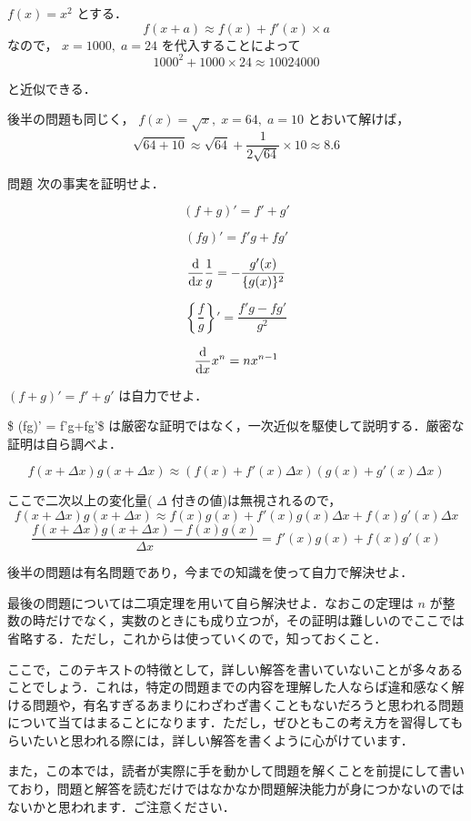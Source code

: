 \documentclass[
  b4paperpaper,
  xelatex,ja=standard]{bxjsbook}
\begin{document}

\(f(x)=x^2\) とする． \[f(x+a) \approx f(x) + f'(x) \times a\] なので，
\(x=1000,\; a=24\) を代入することによって
\[1000^2 + 1000 \times 24 \approx 10024000\]

と近似できる．

後半の問題も同じく， \(f(x)=\sqrt{x},\; x=64,\; a=10\) とおいて解けば，
\[\sqrt{64+10} \approx \sqrt{64} + \frac{1}{2\sqrt{64}} \times 10 \approx 8.6 \]

\begin{Qbox}{問題}
次の事実を証明せよ．

\[(f+g)'=f'+g'\]

\[ (fg)' = f'g+fg'\]

\[\dv{x}\frac{1}{g}=-\frac{g'(x)}{\{g(x)\}^2}\]

\[\left\{ \frac{f}{g} \right\} ' = \frac{f'g-fg'}{g^2}\]

\[\dv{x} x^n = nx^{n-1}\]

\end{Qbox}


\((f+g)'=f'+g'\) は自力でせよ．

\$ (fg)' = f'g+fg'\$
は厳密な証明ではなく，一次近似を駆使して説明する．厳密な証明は自ら調べよ．

\[f(x+\Delta x)g(x+\Delta x) \approx (f(x)+f'(x)\Delta x)(g(x)+g'(x)\Delta x)\]

ここで二次以上の変化量( \(\Delta\) 付きの値)は無視されるので，
\[f(x+\Delta x)g(x+\Delta x) \approx f(x)g(x) + f'(x)g(x)\Delta x + f(x)g'(x)\Delta x\]
\[\frac{f(x+\Delta x)g(x+\Delta x)-f(x)g(x)}{\Delta x} = f'(x)g(x)+f(x)g'(x)\]

後半の問題は有名問題であり，今までの知識を使って自力で解決せよ．

最後の問題については二項定理を用いて自ら解決せよ．なおこの定理は \(n\)
が整数の時だけでなく，実数のときにも成り立つが，その証明は難しいのでここでは省略する．ただし，これからは使っていくので，知っておくこと．

ここで，このテキストの特徴として，詳しい解答を書いていないことが多々あることでしょう．これは，特定の問題までの内容を理解した人ならば違和感なく解ける問題や，有名すぎるあまりにわざわざ書くこともないだろうと思われる問題について当てはまることになります．ただし，ぜひともこの考え方を習得してもらいたいと思われる際には，詳しい解答を書くように心がけています．

また，この本では，読者が実際に手を動かして問題を解くことを前提にして書いており，問題と解答を読むだけではなかなか問題解決能力が身につかないのではないかと思われます．ご注意ください．
\end{document}
